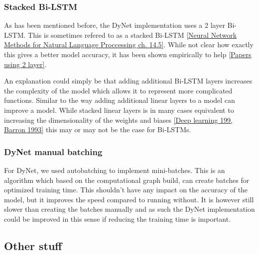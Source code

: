 \subsubsection{Stacked Bi-LSTM}

As has been mentioned before, the DyNet implementation uses a 2 layer Bi-LSTM.
This is sometimes refered to as a stacked Bi-LSTM \ref{Neural Network Methods
for Natural Language Proccessing ch. 14.5}. While not clear how exactly this
gives a better model accuracy, it has been shown empirically to help
\ref{Papers using 2 layer}.

An explanation could simply be that adding additional Bi-LSTM layers increases
the complexity of the model which allows it to represent more complicated
functions. Similar to the way adding additional linear layers to a model can
improve a model. While stacked linear layers is in many cases equivalent to
increasing the dimensionality of the weights and biases \ref{Deep learning 199,
Barron 1993} this may or may not be the case for Bi-LSTMs.

\subsubsection{DyNet manual batching}

For DyNet, we used autobatching to implement mini-batches. This is an algorithm
which based on the computational graph build, can create batches for optimized
training time. This shouldn't have any impact on the accuracy of the model, but
it improves the speed compared to running without. It is however still slower
than creating the batches manually and as such the DyNet implementation could be
improved in this sense if reducing the training time is important.


\subsection{Other stuff}


